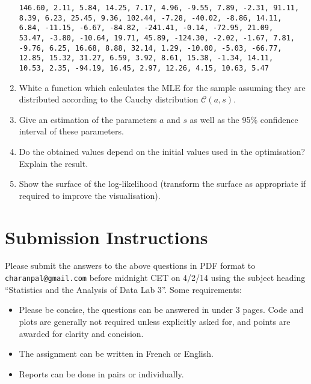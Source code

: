 \documentclass[a4paper,10pt]{article}
\begin{document}
\begin{enumerate}
\begin{lstlisting}
146.60, 2.11, 5.84, 14.25, 7.17, 4.96, -9.55, 7.89, -2.31, 91.11,
8.39, 6.23, 25.45, 9.36, 102.44, -7.28, -40.02, -8.86, 14.11, 
6.84, -11.15, -6.67, -84.82, -241.41, -0.14, -72.95, 21.09, 
53.47, -3.80, -10.64, 19.71, 45.89, -124.30, -2.02, -1.67, 7.81, 
-9.76, 6.25, 16.68, 8.88, 32.14, 1.29, -10.00, -5.03, -66.77, 
12.85, 15.32, 31.27, 6.59, 3.92, 8.61, 15.38, -1.34, 14.11, 
10.53, 2.35, -94.19, 16.45, 2.97, 12.26, 4.15, 10.63, 5.47
\end{lstlisting}
\item White a function which calculates the MLE for the sample assuming they are distributed according to the Cauchy distribution $\mathcal{C}(a, s)$. 
\item Give an estimation of the parameters $a$ and $s$ as well as the 95\% confidence interval of these parameters. 
\item Do the obtained values depend on the initial values used in the optimisation? Explain the result. 
\item Show the surface of the log-likelihood (transform the surface as appropriate if required to improve the visualisation). 
\end{enumerate}


\section{Submission Instructions}

Please submit the answers to the above questions in PDF format to \texttt{charanpal@gmail.com} before midnight CET on 4/2/14 using the subject heading ``Statistics and the Analysis of Data Lab 3''. Some requirements: 
\begin{itemize} 
 \item Please be concise, the questions can be answered in under 3 pages. Code and plots are generally not required unless explicitly asked for, and points are awarded for clarity and concision. 
 \item The assignment can be written in French or English. 
 \item Reports can be done in pairs or individually.    
\end{itemize}
\end{document}
